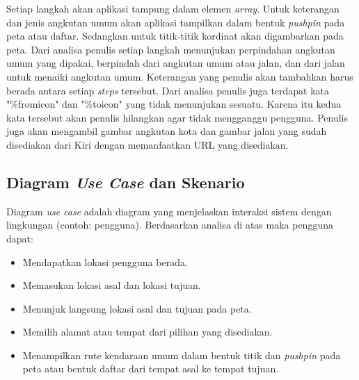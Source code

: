 Setiap langkah akan aplikasi tampung dalam elemen \textit{array}. Untuk keterangan dan jenis angkutan umum akan aplikasi tampilkan dalam bentuk \textit{pushpin} pada peta atau daftar. Sedangkan untuk titik-titik kordinat akan digambarkan pada peta. Dari analisa penulis setiap langkah menunjukan perpindahan angkutan umum yang dipakai, berpindah dari angkutan umum atau jalan, dan dari jalan untuk menaiki angkutan umum. Keterangan yang penulis akan tambahkan harus berada antara setiap \textit{steps} tersebut. Dari analisa penulis juga terdapat kata "\%fromicon" dan "\%toicon" yang tidak menunjukan sesuatu. Karena itu kedua kata tersebut akan penulis hilangkan agar tidak mengganggu pengguna. Penulis juga akan mengambil gambar angkutan kota dan gambar jalan yang sudah disediakan dari Kiri dengan memanfaatkan URL yang disediakan. 

\subsection{Diagram \textit{Use Case} dan Skenario}
\label{lab:Diagram Use-Case dan Scenario}
\hspace{0.5cm} Diagram \textit{use case} adalah diagram yang menjelaskan interaksi sistem dengan lingkungan (contoh: pengguna). Berdasarkan analisa di atas maka pengguna dapat:
\begin{itemize}
	\item Mendapatkan lokasi pengguna berada.
	\item Memasukan lokasi asal dan lokasi tujuan.
	\item Menunjuk langsung lokasi asal dan tujuan pada peta.
	\item Memilih alamat atau tempat dari pilihan yang disediakan.
	\item Menampilkan rute kendaraan umum dalam bentuk titik dan \textit{pushpin} pada peta atau bentuk daftar dari tempat asal ke tempat tujuan.
\end{itemize}

